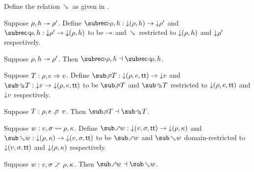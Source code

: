 \begin{definition}
   \label{def:core-language:closeDefs-bwd}
   Define the relation $\closeDefsBwdR$ as given in .
\end{definition}

\begin{definition}
   Suppose $\rho, h \twoheadrightarrow \rho'$. Define $\closeDefsFwdF{\rho,h}: \Below{(\rho, h)} \to \Below{\rho'}$ and $\closeDefsBwdF{\rho,h}: \Below{\rho'} \to \Below{(\rho, h)}$ to be $\twoheadrightarrow$ and $\closeDefsBwdR$ restricted to ${\downarrow}{(\rho, h)}$ and ${\downarrow}{\rho'}$ respectively.
\end{definition}

\begin{theorem}
\label{thm:core-language:closeDefs:gc}
   Suppose $\rho, h \twoheadrightarrow \rho'$.  Then $\closeDefsFwdF{\rho,h} \adjoint \closeDefsBwdF{\rho,h}$.
\end{theorem}

\begin{definition}
   Suppose $T: \rho, e \Rightarrow v$. Define $\evalFwdF{T}: \Below{(\rho, e, \TT)} \to \Below{v}$ and $\evalBwdF{T}: \Below{v} \to \Below{(\rho, e, \TT)}$ to be $\evalFwdR{T}$ and $\evalBwdR{T}$ restricted to ${\downarrow}{(\rho, e, \mathsf{tt})}$ and ${\downarrow}{v}$ respectively.
\end{definition}

\begin{theorem}
\label{thm:core-language:eval:gc}
   Suppose $T: \rho, e \evalFwdS v$.  Then $\evalFwdF{T} \adjoint \evalBwdF{T}$.
\end{theorem}

\begin{definition}
   Suppose $w: v, \sigma \rightsquigarrow \rho, \kappa$. Define $\matchFwdF{w}: \Below{(v,\sigma,\TT)} \to \Below{(\rho,\kappa)}$ and $\matchBwdF{w}: \Below{(\rho,\kappa)} \to \Below{(v,\sigma,\TT)}$ to be $\matchFwdR{w}$ and $\matchBwdR{w}$ domain-restricted to ${\downarrow}{(v,\sigma,\mathsf{tt})}$ and ${\downarrow}{(\rho,\kappa)}$ respectively.
\end{definition}

\begin{theorem}
\label{thm:core-language:match:gc}
   Suppose $w: v, \sigma \matchFwdS \rho, \kappa$.  Then $\matchFwdF{w} \adjoint \matchBwdF{w}$.
\end{theorem}

